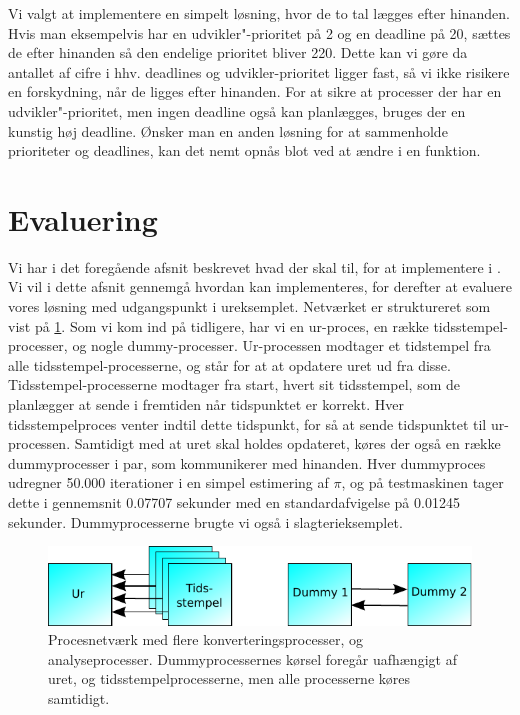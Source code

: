 Vi valgt at implementere en simpelt løsning, hvor  de to tal lægges efter hinanden. Hvis man eksempelvis har en udvikler"-prioritet på 2 og en deadline på 20, sættes de efter hinanden så den endelige prioritet bliver 220. Dette kan vi gøre da antallet af cifre i hhv. deadlines og udvikler-prioritet ligger fast, så vi ikke risikere en forskydning, når de ligges efter hinanden. For at sikre at processer der har en udvikler"-prioritet, men ingen deadline også kan planlægges, bruges der en kunstig høj deadline. Ønsker man en anden løsning for at sammenholde prioriteter og deadlines, kan det nemt opnås blot ved at ændre i en funktion.
    
\section{Evaluering}
Vi har i det foregående afsnit beskrevet hvad der skal til, for at implementere \is i \pycsp. Vi vil i dette afsnit gennemgå hvordan \is kan implementeres, for derefter at evaluere vores løsning med udgangspunkt i ureksemplet.
Netværket er struktureret som vist på \cref{fig:watch_network}. Som vi kom ind på tidligere, har vi en ur-proces, en række tidsstempel-processer, og nogle dummy-processer. Ur-processen modtager et tidstempel fra alle  tidsstempel-processerne, og står for at at opdatere uret ud fra disse. Tidsstempel-processerne modtager fra start, hvert sit tidsstempel, som de planlægger at sende i fremtiden når tidspunktet er korrekt. Hver tidsstempelproces  venter indtil dette tidspunkt, for så at sende tidspunktet til ur-processen. Samtidigt med at uret skal holdes opdateret, køres der også en række dummyprocesser i par, som kommunikerer med hinanden. Hver dummyproces udregner 50.000 iterationer i en simpel estimering af $\pi$, og på testmaskinen tager dette i gennemsnit 0.07707 sekunder med en standardafvigelse på 0.01245 sekunder. Dummyprocesserne brugte vi også i slagterieksemplet.
\begin{figure}
 \begin{center}
  \includegraphics[scale=1]{images/watch-network}
	\caption{Procesnetværk med flere konverteringsprocesser, og analyseprocesser. Dummyprocessernes kørsel foregår uafhængigt af uret, og tidsstempelprocesserne, men alle processerne køres samtidigt.}
	\label{fig:watch_network}
\end{center}
\end{figure}

